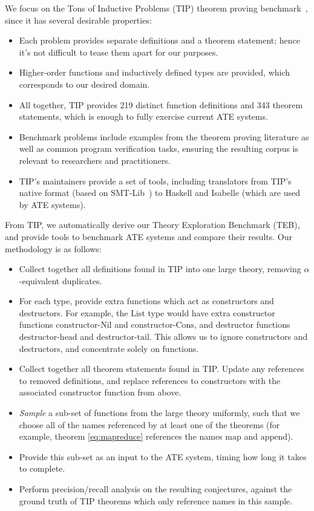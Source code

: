 We focus on the Tons of Inductive Problems (TIP) theorem proving
benchmark~\cite{claessen2015tip}, since it has several desirable properties:

\begin{itemize}
\item Each problem provides separate definitions and a theorem statement; hence
  it's not difficult to tease them apart for our purposes.
\item Higher-order functions and inductively defined types are provided, which
  corresponds to our desired domain.
\item All together, TIP provides 219 distinct function definitions and 343
  theorem statements, which is enough to fully exercise current ATE systems.
\item Benchmark problems include examples from the theorem proving literature
  as well as common program verification tasks, ensuring the resulting corpus is
  relevant to researchers and practitioners.
\item TIP's maintainers provide a set of tools, including translators from TIP's
  native format (based on SMT-Lib~\cite{BarFT-SMTLIB}) to Haskell and Isabelle
  (which are used by ATE systems).
\end{itemize}

From TIP, we automatically derive our Theory Exploration Benchmark (TEB), and
provide tools to benchmark ATE systems and compare their results. Our
methodology is as follows:

\begin{itemize}
\item Collect together all definitions found in TIP into one large theory,
  removing $\alpha$-equivalent duplicates.
\item For each type, provide extra functions which act as constructors and
  destructors. For example, the $\text{List}$ type would have extra constructor
  functions $\text{constructor-Nil}$ and $\text{constructor-Cons}$, and
  destructor functions $\text{destructor-head}$ and $\text{destructor-tail}$.
  This allows us to ignore constructors and destructors, and concentrate solely
  on functions.
\item Collect together all theorem statements found in TIP. Update any
  references to removed definitions, and replace references to constructors with
  the associated constructor function from above.
\item \emph{Sample} a sub-set of functions from the large theory uniformly, such
  that we choose all of the names referenced by at least one of the theorems
  (for example, theorem \ref{eq:mapreduce} references the names
  $\text{map}$ and $\text{append}$).
\item Provide this sub-set as an input to the ATE system, timing how long it
  takes to complete.
\item Perform precision/recall analysis on the resulting conjectures, against
  the ground truth of TIP theorems which only reference names in this sample.
\end{itemize}

